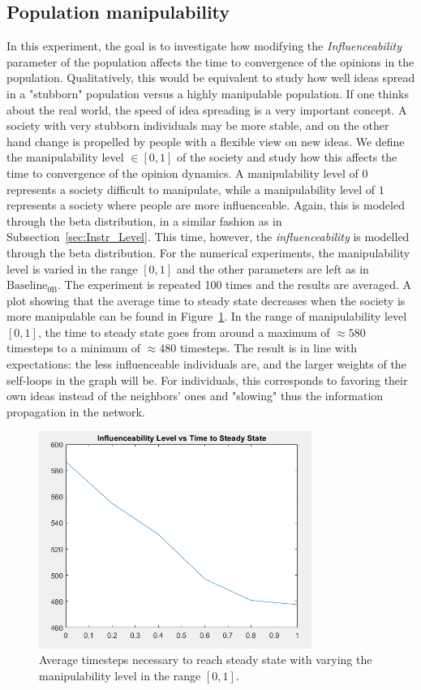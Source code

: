 \subsection{Population manipulability}
\label{sec:manipulability}
In this experiment, the goal is to investigate how modifying the \textit{Influenceability} parameter of the population affects the time to convergence of the opinions in the population. Qualitatively, this would be equivalent to study how well ideas spread in a "stubborn" population versus a highly manipulable population. If one thinks about the real world, the speed of idea spreading is a very important concept. A society with very stubborn individuals may be more stable, and on the other hand change is propelled by people with a flexible view on new ideas. 
We define the manipulability level $\in [0,1]$ of the society and study how this affects the time to convergence of the opinion dynamics. A manipulability level of $0$ represents a society difficult to manipulate, while a manipulability level of $1$ represents a society where people are more influenceable. Again, this is modeled through the beta distribution, in a similar fashion as in Subsection~\ref{sec:Instr_Level}. This time, however, the \textit{influenceability} is modelled through the beta distribution. For the numerical experiments, the manipulability level is varied in the range $[0,1]$ and the other parameters are left as in $\text{Baseline}_\text{0B}$. The experiment is repeated 100 times and the results are averaged. A plot showing that the average time to steady state decreases when the society is more manipulable can be found in Figure~\ref{pics:man_steadystate}. In the range of manipulability level $[0,1]$, the time to steady state goes from around a maximum of $\approx 580$ timesteps to a minimum of $\approx 480$ timesteps. The result is in line with expectations: the less influenceable individuals are, and the larger weights of the self-loops in the graph will be. For individuals, this corresponds to favoring their own ideas instead of the neighbors' ones and "slowing" thus the information propagation in the network.
\begin{figure}[!t]
	\centering
	\includegraphics[width=3.5in]{Figures/Exp8_2.png}
	\caption{Average timesteps necessary to reach steady state with varying the manipulability level in the range $[0,1]$.}
\label{pics:man_steadystate}
\end{figure}


